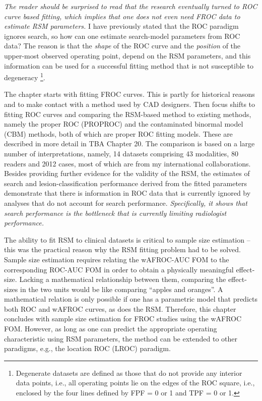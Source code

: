 \documentclass[
]{book}
\begin{document}
\emph{The reader should be surprised to read that the research eventually turned to ROC curve based fitting, which implies that one does not even need FROC data to estimate RSM parameters.} I have previously stated that the ROC paradigm ignores search, so how can one estimate search-model parameters from ROC data? The reason is that the \emph{shape} of the ROC curve and the \emph{position} of the upper-most observed operating point, depend on the RSM parameters, and this information can be used for a successful fitting method that is not susceptible to degeneracy \footnote{Degenerate datasets are defined as those that do not provide any interior data points, i.e., all operating points lie on the edges of the ROC square, i.e., enclosed by the four lines defined by FPF = 0 or 1 and TPF = 0 or 1.}.

The chapter starts with fitting FROC curves. This is partly for historical reasons and to make contact with a method used by CAD designers. Then focus shifts to fitting ROC curves and comparing the RSM-based method to existing methods, namely the proper ROC (PROPROC) \citep{metz1999proper, RN2413} and the contaminated binormal model (CBM) \citep{RN1501} methods, both of which are proper ROC fitting models. These are described in more detail in TBA Chapter 20. The comparison is based on a large number of interpretations, namely, 14 datasets comprising 43 modalities, 80 readers and 2012 cases, most of which are from my international collaborations. Besides providing further evidence for the validity of the RSM, the estimates of search and lesion-classification performance derived from the fitted parameters demonstrate that there is information in ROC data that is currently ignored by analyses that do not account for search performance. \emph{Specifically, it shows that search performance is the bottleneck that is currently limiting radiologist performance.}

The ability to fit RSM to clinical datasets is critical to sample size estimation -- this was the practical reason why the RSM fitting problem had to be solved. Sample size estimation requires relating the wAFROC-AUC FOM to the corresponding ROC-AUC FOM in order to obtain a physically meaningful effect-size. Lacking a mathematical relationship between them, comparing the effect-sizes in the two units would be like comparing ``apples and oranges''. A mathematical relation is only possible if one has a parametric model that predicts both ROC and wAFROC curves, as does the RSM. Therefore, this chapter concludes with sample size estimation for FROC studies using the wAFROC FOM. However, as long as one can predict the appropriate operating characteristic using RSM parameters, the method can be extended to other paradigms, e.g., the location ROC (LROC) \citep{RN1654} paradigm.
\end{document}
